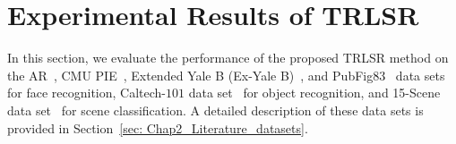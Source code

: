 \section{Experimental Results of TRLSR}
\label{sec: Chap6_TRLSR_results}
%
In this section, we evaluate the performance of the proposed TRLSR method on the AR~\cite{Data_AR,LCKSVD}, CMU PIE~\cite{CMU_PIE}, Extended Yale B (Ex-Yale B)~\cite{Yale_B}, and PubFig83~\cite{PubFig83} data sets for face recognition, Caltech-$101$ data set~\cite{Caltech101} for object recognition, and 15-Scene data set~\cite{15scene_1,15scene_2,15scene_3} for scene classification.
A detailed description of these data sets is provided in Section~\ref{sec: Chap2_Literature_datasets}.
%
